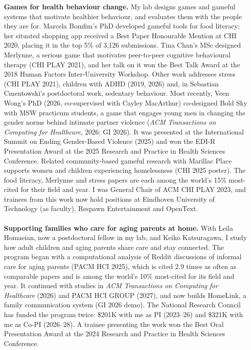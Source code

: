 \documentclass[11pt]{article}
\begin{document}
\textbf{Games for health behaviour change.} My lab designs games and gameful systems that motivate healthier behaviour, and evaluates them with the people they are for. Marcela Bomfim's PhD developed gameful tools for food literacy; her situated shopping app received a Best Paper Honourable Mention at CHI 2020, placing it in the top 5\% of 3,126 submissions. Tina Chan's MSc designed Merlynne, a serious game that motivates peer-to-peer cognitive behavioural therapy (CHI PLAY 2021), and her talk on it won the Best Talk Award at the 2018 Human Factors Inter-University Workshop. Other work addresses stress (CHI PLAY 2021), children with ADHD (2019, 2026) and, in Sebastian Cmentowski's postdoctoral work, sedentary behaviour. Most recently, Veen Wong's PhD (2026, co-supervised with Cayley MacArthur) co-designed Bold Sky with MSW practicum students, a game that engages young men in changing the gender norms behind intimate partner violence (\emph{ACM Transactions on Computing for Healthcare}, 2026; GI 2026). It was presented at the International Summit on Ending Gender-Based Violence (2025) and won the EDI-R Presentation Award at the 2025 Research and Practice in Health Sciences Conference. Related community-based gameful research with Marillac Place supports women and children experiencing homelessness (CHI 2025 poster). The food literacy, Merlynne and stress papers are each among the world's 15\% most-cited for their field and year. I was General Chair of ACM CHI PLAY 2023, and trainees from this work now hold positions at Eindhoven University of Technology (as faculty), Respawn Entertainment and OpenText.
\\ \\
\textbf{Supporting families who care for aging parents at home.} With Leila Homaeian, now a postdoctoral fellow in my lab, and Keiko Katsuragawa, I study how adult children and aging parents share care and stay connected. The program began with a computational analysis of Reddit discussions of informal care for aging parents (PACM HCI 2025), which is cited 2.9 times as often as comparable papers and is among the world's 10\% most-cited for its field and year. It continued with studies in \emph{ACM Transactions on Computing for Healthcare} (2026) and PACM HCI GROUP (2027), and now builds HomeLink, a family communication system (GI 2026 demo). The National Research Council has funded the program twice: \$201K with me as PI (2023--26) and \$321K with me as Co-PI (2026--28). A trainee presenting the work won the Best Oral Presentation Award at the 2024 Research and Practice in Health Sciences Conference.
\end{document}
